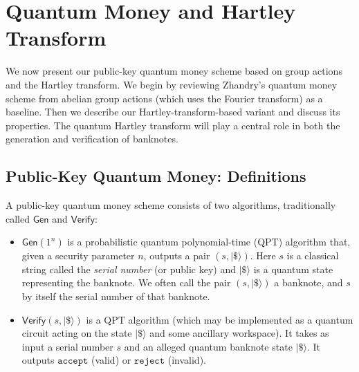 \documentclass[12pt]{report}
\begin{document}





\chapter{Quantum Money and Hartley Transform}\label{chap:quantum_money}

We now present our public-key quantum money scheme based on group actions and the Hartley transform. We begin by reviewing Zhandry’s quantum money scheme from abelian group actions (which uses the Fourier transform) as a baseline. Then we describe our Hartley-transform-based variant and discuss its properties. The quantum Hartley transform will play a central role in both the generation and verification of banknotes.

\section{Public-Key Quantum Money: Definitions}
A public-key quantum money scheme consists of two algorithms, traditionally called $\mathsf{Gen}$ and $\mathsf{Verify}$:
\begin{itemize}
    \item $\mathsf{Gen}(1^n)$ is a probabilistic quantum polynomial-time (QPT) algorithm that, given a security parameter $n$, outputs a pair $(s, |\$\rangle)$. Here $s$ is a classical string called the \emph{serial number} (or public key) and $|\$\rangle$ is a quantum state representing the banknote. We often call the pair $(s, |\$\rangle)$ a banknote, and $s$ by itself the serial number of that banknote.
    \item $\mathsf{Verify}(s, |\$\rangle)$ is a QPT algorithm (which may be implemented as a quantum circuit acting on the state $|\$\rangle$ and some ancillary workspace). It takes as input a serial number $s$ and an alleged quantum banknote state $|\$\rangle$. It outputs $\mathtt{accept}$ (valid) or $\mathtt{reject}$ (invalid).
\end{itemize}
\end{document}
